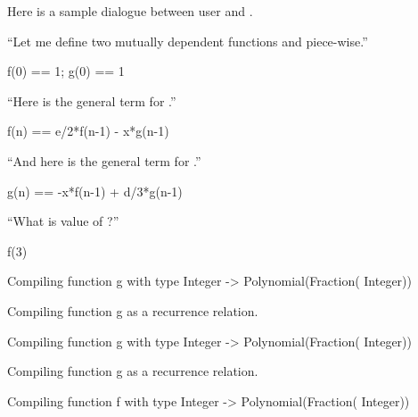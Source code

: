 {{{{{{{{Here is a sample dialogue between user and \Language{}.
\begin{xtc}
\begin{xtccomment}
``Let me define
two mutually dependent functions  and  piece-wise.''
\end{xtccomment}
\begin{spadsrc}
f(0) == 1; g(0) == 1
\end{spadsrc}
\end{xtc}
\begin{xtc}
\begin{xtccomment}
``Here is the general term for .''
\end{xtccomment}
\begin{spadsrc}
f(n) == e/2*f(n-1) - x*g(n-1)
\end{spadsrc}
\end{xtc}
\begin{xtc}
\begin{xtccomment}
``And here is the general term for .''
\end{xtccomment}
\begin{spadsrc}
g(n) == -x*f(n-1) + d/3*g(n-1)
\end{spadsrc}
\end{xtc}
\begin{xtc}
\begin{xtccomment}
``What is value of ?''
\end{xtccomment}
\begin{spadsrc}
f(3)
\end{spadsrc}
\begin{MessageOutput}
   Compiling function g with type Integer -> Polynomial(Fraction(
      Integer)) 
\end{MessageOutput}
\begin{MessageOutput}
   Compiling function g as a recurrence relation.
\end{MessageOutput}
\begin{MessageOutput}
   Compiling function g with type Integer -> Polynomial(Fraction(
      Integer)) 
\end{MessageOutput}
\begin{MessageOutput}
   Compiling function g as a recurrence relation.
\end{MessageOutput}
\begin{MessageOutput}
   Compiling function f with type Integer -> Polynomial(Fraction(
      Integer)) 
\end{MessageOutput}
\begin{MessageOutput}

\end{MessageOutput}
\end{xtc}}}}}}}}}
